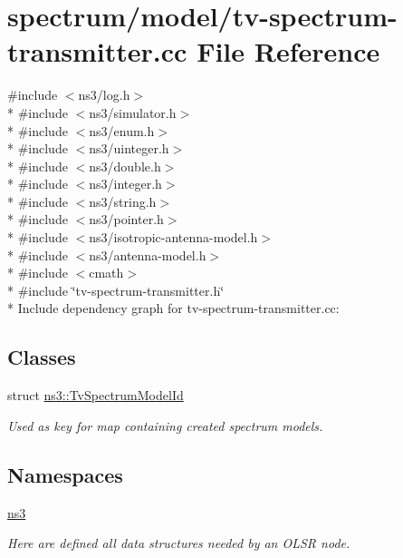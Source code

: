 \hypertarget{tv-spectrum-transmitter_8cc}{}\section{spectrum/model/tv-\/spectrum-\/transmitter.cc File Reference}
\label{tv-spectrum-transmitter_8cc}
{\ttfamily \#include $<$ns3/log.\+h$>$}\\*
{\ttfamily \#include $<$ns3/simulator.\+h$>$}\\*
{\ttfamily \#include $<$ns3/enum.\+h$>$}\\*
{\ttfamily \#include $<$ns3/uinteger.\+h$>$}\\*
{\ttfamily \#include $<$ns3/double.\+h$>$}\\*
{\ttfamily \#include $<$ns3/integer.\+h$>$}\\*
{\ttfamily \#include $<$ns3/string.\+h$>$}\\*
{\ttfamily \#include $<$ns3/pointer.\+h$>$}\\*
{\ttfamily \#include $<$ns3/isotropic-\/antenna-\/model.\+h$>$}\\*
{\ttfamily \#include $<$ns3/antenna-\/model.\+h$>$}\\*
{\ttfamily \#include $<$cmath$>$}\\*
{\ttfamily \#include \char`\"{}tv-\/spectrum-\/transmitter.\+h\char`\"{}}\\*
Include dependency graph for tv-\/spectrum-\/transmitter.cc\+:
\subsection*{Classes}
\begin{DoxyCompactItemize}
\item 
struct \hyperlink{structns3_1_1TvSpectrumModelId}{ns3\+::\+Tv\+Spectrum\+Model\+Id}
\begin{DoxyCompactList}\small\item\em Used as key for map containing created spectrum models. \end{DoxyCompactList}\end{DoxyCompactItemize}
\subsection*{Namespaces}
\begin{DoxyCompactItemize}
\item 
 \hyperlink{namespacens3}{ns3}
\begin{DoxyCompactList}\small\item\em Here are defined all data structures needed by an O\+L\+SR node. \end{DoxyCompactList}\end{DoxyCompactItemize}
